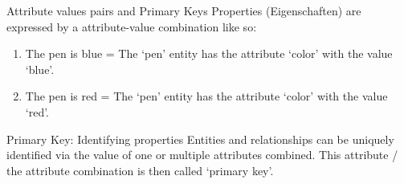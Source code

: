 \begin{frame}{Attribute values pairs and Primary Keys}
    Properties (Eigenschaften) are expressed by a attribute-value combination like so: 
    \begin{enumerate}
        \item The pen is blue = The `pen' entity has the attribute `color' with the value `blue'. 
        \item The pen is red = The `pen' entity has the attribute `color' with the value `red'. 
    \end{enumerate}

\begin{exampleblock}{Primary Key: Identifying properties}
Entities and relationships can be uniquely identified via the value of one or multiple attributes combined. This attribute / the attribute combination is then called `primary key'. 
\end{exampleblock}
\end{frame}


